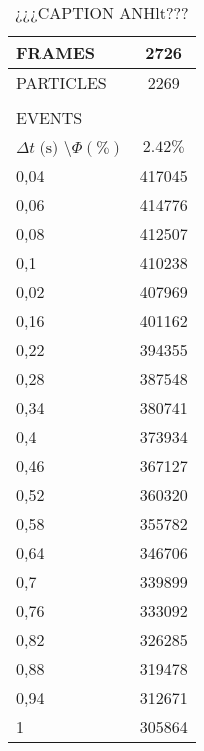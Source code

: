 \begin{table}[H]
	\begin{tabular}{ll}
		\hline
		\multicolumn{1}{|l|}{FRAMES} & \multicolumn{1}{c|}{2726} \\ \hline
		\multicolumn{1}{|l|}{PARTICLES} & \multicolumn{1}{c|}{2269} \\ \hline
		&  \\ \cline{1-1}
		\multicolumn{1}{|l|}{EVENTS} &  \\ \hline
		\multicolumn{1}{|l|}{$\Delta t \; \textrm{(s)}$ \textbackslash $\Phi (\%)$} & \multicolumn{1}{c|}{$2.42\%$} \\ \hline
		\multicolumn{1}{|l|}{0,04} & \multicolumn{1}{c|}{417045}\\ \hline
		\multicolumn{1}{|l|}{0,06} & \multicolumn{1}{c|}{414776}\\ \hline
		\multicolumn{1}{|l|}{0,08} & \multicolumn{1}{c|}{412507}\\ \hline
		\multicolumn{1}{|l|}{0,1}  & \multicolumn{1}{c|}{410238}\\ \hline
		\multicolumn{1}{|l|}{0,02} & \multicolumn{1}{c|}{407969}\\ \hline
		\multicolumn{1}{|l|}{0,16} & \multicolumn{1}{c|}{401162}\\ \hline
		\multicolumn{1}{|l|}{0,22} & \multicolumn{1}{c|}{394355}\\ \hline
		\multicolumn{1}{|l|}{0,28} & \multicolumn{1}{c|}{387548}\\ \hline
		\multicolumn{1}{|l|}{0,34} & \multicolumn{1}{c|}{380741}\\ \hline
		\multicolumn{1}{|l|}{0,4}  & \multicolumn{1}{c|}{373934}\\ \hline
		\multicolumn{1}{|l|}{0,46} & \multicolumn{1}{c|}{367127}\\ \hline
		\multicolumn{1}{|l|}{0,52} & \multicolumn{1}{c|}{360320}\\ \hline
		\multicolumn{1}{|l|}{0,58} & \multicolumn{1}{c|}{355782}\\ \hline
		\multicolumn{1}{|l|}{0,64} & \multicolumn{1}{c|}{346706}\\ \hline
		\multicolumn{1}{|l|}{0,7}  & \multicolumn{1}{c|}{339899}\\ \hline
		\multicolumn{1}{|l|}{0,76} & \multicolumn{1}{c|}{333092}\\ \hline
		\multicolumn{1}{|l|}{0,82} & \multicolumn{1}{c|}{326285}\\ \hline
		\multicolumn{1}{|l|}{0,88} & \multicolumn{1}{c|}{319478}\\ \hline
		\multicolumn{1}{|l|}{0,94} & \multicolumn{1}{c|}{312671}\\ \hline
		\multicolumn{1}{|l|}{1}    & \multicolumn{1}{c|}{305864}\\ \hline
	\end{tabular}
	\caption{¿¿¿CAPTION ANHlt???}
	\label{table_ANHlt}
\end{table}

